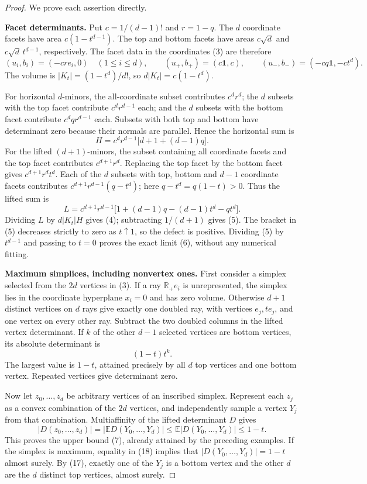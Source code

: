 \begin{proof}
We prove each assertion directly.

\medskip\noindent\textbf{Facet determinants.}
Put $c=1/(d-1)!$ and $r=1-q$. The $d$ coordinate facets have area
$c(1-t^{d-1})$. The top and bottom facets have areas $c\sqrt d$ and
$c\sqrt d\,t^{d-1}$, respectively. The facet data in the coordinates (3) are
therefore
\[
 (u_i,b_i)=(-cr e_i,0)\quad(1\le i\le d),\qquad
 (u_+,b_+)=(c\mathbf1,c),\qquad
 (u_-,b_-)=(-cq\mathbf1,-ct^d).
 \tag{14}
\]
The volume is $|K_t|=(1-t^d)/d!$, so $d|K_t|=c(1-t^d)$.

For horizontal $d$-minors, the all-coordinate subset contributes $c^d r^d$;
the $d$ subsets with the top facet contribute $c^d r^{d-1}$ each; and the
$d$ subsets with the bottom facet contribute $c^d q r^{d-1}$ each.
Subsets with both top and bottom have determinant zero because their normals
are parallel. Hence the horizontal sum is
\[
 H=c^d r^{d-1}\bigl[d+1+(d-1)q\bigr].
 \tag{15}
\]
For the lifted $(d+1)$-minors, the subset containing all coordinate facets
and the top facet contributes $c^{d+1}r^d$. Replacing the top facet by the
bottom facet gives $c^{d+1}r^dt^d$. Each of the $d$ subsets with top, bottom and $d-1$
coordinate facets contributes
$c^{d+1}r^{d-1}(q-t^d)$; here $q-t^d=q(1-t)>0$.
Thus the lifted sum is
\[
 L=c^{d+1}r^{d-1}
   \bigl[1+(d-1)q-(d-1)t^d-qt^d\bigr].
 \tag{16}
\]
Dividing $L$ by $d|K_t|H$ gives (4); subtracting $1/(d+1)$ gives (5).
The bracket in (5) decreases strictly to zero as $t\uparrow1$, so the defect
is positive. Dividing (5) by $t^{d-1}$ and passing to $t=0$ proves the exact
limit (6), without any numerical fitting.

\medskip\noindent\textbf{Maximum simplices, including nonvertex ones.}
First consider a simplex selected from the $2d$ vertices in (3). If a ray
$\mathbb R_+e_i$ is unrepresented, the simplex lies in the coordinate
hyperplane $x_i=0$ and has zero volume. Otherwise $d+1$ distinct vertices
on $d$ rays give exactly one doubled ray, with vertices $e_j,te_j$, and one
vertex on every other ray. Subtract the two doubled columns in the lifted
vertex determinant. If $k$ of the other $d-1$ selected vertices are bottom
vertices, its absolute determinant is
\[
 (1-t)t^k.
 \tag{17}
\]
The largest value is $1-t$, attained precisely by all $d$ top vertices and
one bottom vertex. Repeated vertices give determinant zero.

Now let $z_0,\ldots,z_d$ be arbitrary vertices of an inscribed simplex.
Represent each $z_j$ as a convex combination of the $2d$ vertices, and
independently sample a vertex $Y_j$ from that combination. Multiaffinity of
the lifted determinant $D$ gives
\[
 |D(z_0,\ldots,z_d)|
 =|\mathbb E D(Y_0,\ldots,Y_d)|
 \le\mathbb E|D(Y_0,\ldots,Y_d)|\le1-t.
 \tag{18}
\]
This proves the upper bound (7), already attained by the preceding examples.
If the simplex is maximum, equality in (18) implies that
$|D(Y_0,\ldots,Y_d)|=1-t$ almost surely. By (17), exactly one of the $Y_j$
is a bottom vertex and the other $d$ are the $d$ distinct top vertices,
almost surely.


\end{proof}
